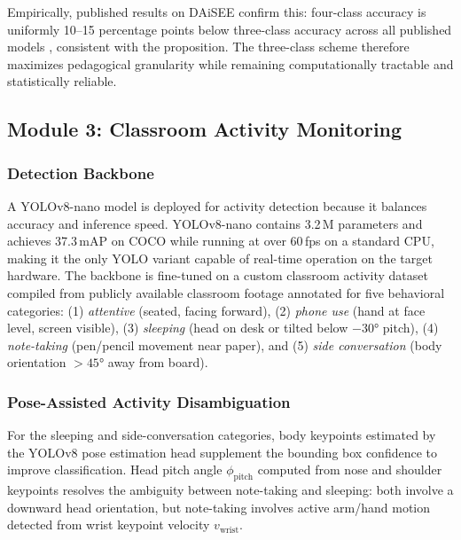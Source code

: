 \documentclass[preprint,12pt]{elsarticle}
\begin{document}
Empirically, published results on DAiSEE confirm this: four-class accuracy is uniformly 10--15 percentage points below three-class accuracy across all published models \cite{engagement_springer}, consistent with the proposition. The three-class scheme therefore maximizes pedagogical granularity while remaining computationally tractable and statistically reliable.

\subsection{Module 3: Classroom Activity Monitoring}

\subsubsection{Detection Backbone}

A YOLOv8-nano model \cite{yolov8} is deployed for activity detection because it balances accuracy and inference speed. YOLOv8-nano contains 3.2\,M parameters and achieves 37.3\,mAP on COCO while running at over 60\,fps on a standard CPU, making it the only YOLO variant capable of real-time operation on the target hardware. The backbone is fine-tuned on a custom classroom activity dataset compiled from publicly available classroom footage annotated for five behavioral categories: (1) \textit{attentive} (seated, facing forward), (2) \textit{phone use} (hand at face level, screen visible), (3) \textit{sleeping} (head on desk or tilted below $-30°$ pitch), (4) \textit{note-taking} (pen/pencil movement near paper), and (5) \textit{side conversation} (body orientation $> 45°$ away from board).

\subsubsection{Pose-Assisted Activity Disambiguation}

For the sleeping and side-conversation categories, body keypoints estimated by the YOLOv8 pose estimation head supplement the bounding box confidence to improve classification. Head pitch angle $\phi_\text{pitch}$ computed from nose and shoulder keypoints resolves the ambiguity between note-taking and sleeping: both involve a downward head orientation, but note-taking involves active arm/hand motion detected from wrist keypoint velocity $v_\text{wrist}$.
\end{document}
